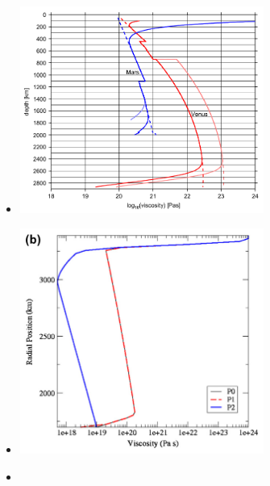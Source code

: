 \begin{itemize}
\item {}

\begin{center}
\includegraphics[width=8cm]{images/mars/viscosity/stwt10}
\end{center}

\item {}

\begin{center}
\includegraphics[width=8cm]{images/mars/viscosity/roar12}
\end{center}

\item {}


\end{itemize}
